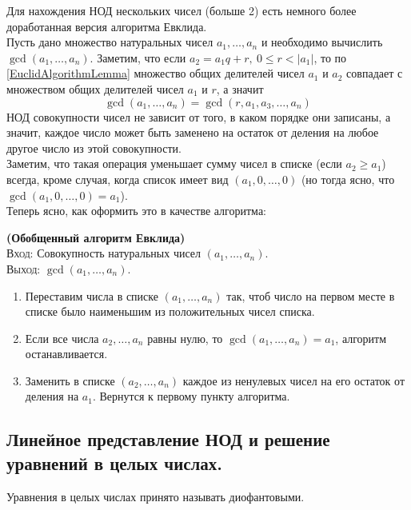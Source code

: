 \documentclass[11pt]{article}
\begin{document}
	Для нахождения НОД нескольких чисел (больше 2) есть немного более доработанная версия алгоритма Евклида. \\
	Пусть дано множество натуральных чисел $a_1, \ldots, a_n$ и необходимо вычислить $\gcd(a_1, \ldots, a_n)$.
	Заметим, что если $a_2 = a_1 q + r, \ 0 \le r < |a_1|$, то по \ref{EuclidAlgorithmLemma} множество общих делителей
	чисел $a_1$ и $a_2$ совпадает с множеством общих делителей чисел $a_1$ и $r$, а значит
	\[ \gcd(a_1, \ldots, a_n) = \gcd(r, a_1, a_3, \ldots, a_n)\]
	НОД совокупности чисел не зависит от того, в каком порядке они записаны, а значит, каждое число может быть заменено на
	остаток от деления на любое другое число из этой совокупности. \\
	Заметим, что такая операция уменьшает сумму чисел в списке (если $a_2 \ge a_1$) всегда, кроме случая, когда
	список имеет вид $(a_1, 0, \ldots, 0)$ (но тогда ясно, что $\gcd(a_1, 0, \ldots, 0) = a_1$).\\
	Теперь ясно, как оформить это в качестве алгоритма:
	\begin{theorem} \textbf{(Обобщенный алгоритм Евклида)}\\
	\textsc{Вход:} Совокупность натуральных чисел  $(a_1, \ldots, a_n)$.\\
	\textsc{Выход:} $\gcd(a_1, \ldots, a_n)$.
		\begin{enumerate}

			\item Переставим числа в списке $(a_1, \ldots, a_n)$ так, чтоб число на первом месте в списке было наименьшим из
				  положительных чисел списка.

			\item Если все числа $a_2, \ldots, a_n$ равны нулю, то $\gcd(a_1, \ldots, a_n) = a_1$, алгоритм останавливается.

			\item Заменить в списке $(a_2, \ldots, a_n)$ каждое из ненулевых чисел на его остаток от деления на $a_1$. Вернутся к первому
				  пункту алгоритма.

		\end{enumerate}
	\end{theorem}
\subsection{Линейное представление НОД и решение уравнений в целых числах.}

	\begin{definition}
		Уравнения в целых числах принято называть диофантовыми.
	\end{definition}
\end{document}
